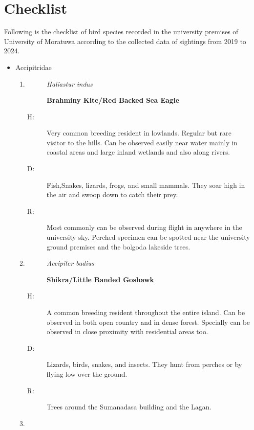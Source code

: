 \chapter{Checklist}
\label{cp:checklist}
Following is the checklist of bird species recorded in the university premises of University of Moratuwa according to the collected data of sightings from 2019 to 2024.
\begin{itemize}%
\item%
 Accipitridae%
\begin{enumerate}%
\item%
\begin{description}%
\item[]%
\textit{Haliastur indus}%
\item[]%
\textbf{Brahminy Kite/Red Backed Sea Eagle}%
\end{description}%
\begin{description}%
\item[H: ]%
Very common breeding resident in lowlands. Regular but rare visitor to the hills. Can be observed easily near water mainly in coastal areas and large inland wetlands and also along rivers.%
\item[D: ]%
Fish,Snakes, lizards, frogs, and small mammals. They soar high in the air and swoop down to catch their prey.%
\item[R: ]%
Most commonly can  be observed during flight in anywhere in the university sky. Perched specimen can be spotted near the university ground premises and the bolgoda lakeside trees.%
\end{description}%
\item%
\begin{description}%
\item[]%
\textit{Accipiter badius}%
\item[]%
\textbf{Shikra/Little Banded Goshawk}%
\end{description}%
\begin{description}%
\item[H: ]%
A common breeding resident throughout the entire island. Can be observed in both open country and in dense forest. Specially can be observed in close proximity with residential areas too.%
\item[D: ]%
 Lizards, birds, snakes, and insects. They hunt from perches or by flying low over the ground.%
\item[R: ]%
Trees around the Sumanadasa building and the Lagan.%
\end{description}%
\item%

\end{enumerate}
\end{itemize}
